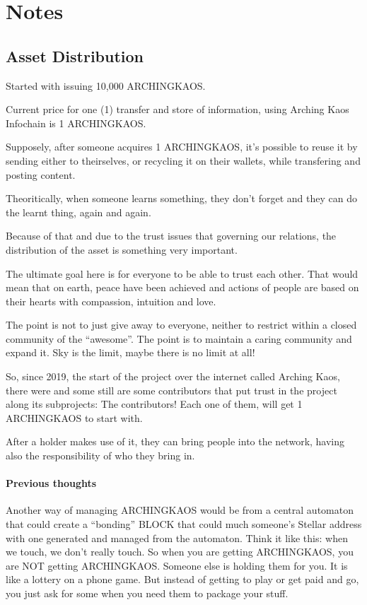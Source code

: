 \documentclass[10pt,a4paper,twocolumn]{paper}
\begin{document}
	
\section{Notes}\label{notes}

	\subsection{Asset Distribution}\label{asset-distribution}

Started with issuing 10,000 ARCHINGKAOS.

Current price for one (1) transfer and store of information, using
Arching Kaos Infochain is 1 ARCHINGKAOS.

Supposely, after someone acquires 1 ARCHINGKAOS, it's possible to reuse
it by sending either to theirselves, or recycling it on their wallets,
while transfering and posting content.

Theoritically, when someone learns something, they don't forget and they
can do the learnt thing, again and again.

Because of that and due to the trust issues that governing our
relations, the distribution of the asset is something very important.

The ultimate goal here is for everyone to be able to trust each other.
That would mean that on earth, peace have been achieved and actions of
people are based on their hearts with compassion, intuition and love.

The point is not to just give away to everyone, neither to restrict
within a closed community of the ``awesome''. The point is to maintain a
caring community and expand it. Sky is the limit, maybe there is no
limit at all!

So, since 2019, the start of the project over the internet called
Arching Kaos, there were and some still are some contributors that put
trust in the project along its subprojects: The contributors! Each one
of them, will get 1 ARCHINGKAOS to start with.

After a holder makes use of it, they can bring people into the network,
having also the responsibility of who they bring in.

	\paragraph{Previous thoughts}\label{previous-thoughts}

Another way of managing ARCHINGKAOS would be from a central automaton
that could create a ``bonding'' BLOCK that could much someone's Stellar
address with one generated and managed from the automaton. Think it like
this: when we touch, we don't really touch. So when you are getting
ARCHINGKAOS, you are NOT getting ARCHINGKAOS. Someone else is holding
them for you. It is like a lottery on a phone game. But instead of
getting to play or get paid and go, you just ask for some when you need
them to package your stuff.
\end{document}
